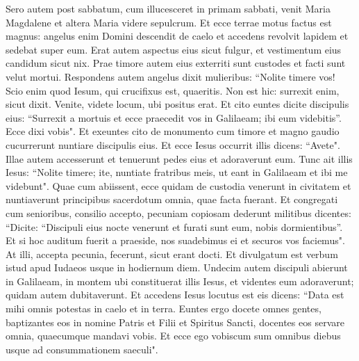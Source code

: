 \begin{biblechapter}  
\verse Sero autem post sabbatum, cum illucesceret in primam sabbati, venit Maria Magdalene et altera Maria videre sepulcrum. 
\verse Et ecce terrae motus factus est magnus: angelus enim Domini descendit de caelo et accedens revolvit lapidem et sedebat super eum. 
\verse Erat autem aspectus eius sicut fulgur, et vestimentum eius candidum sicut nix. 
\verse Prae timore autem eius exterriti sunt custodes et facti sunt velut mortui. 
\verse Respondens autem angelus dixit mulieribus: “Nolite timere vos! Scio enim quod Iesum, qui crucifixus est, quaeritis. 
\verse Non est hic: surrexit enim, sicut dixit. Venite, videte locum, ubi positus erat. 
\verse Et cito euntes dicite discipulis eius: “Surrexit a mortuis et ecce praecedit vos in Galilaeam; ibi eum videbitis”. Ecce dixi vobis". 
\verse Et exeuntes cito de monumento cum timore et magno gaudio cucurrerunt nuntiare discipulis eius. 
\verse Et ecce Iesus occurrit illis dicens: “Avete". Illae autem accesserunt et tenuerunt pedes eius et adoraverunt eum. 
\verse Tunc ait illis Iesus: “Nolite timere; ite, nuntiate fratribus meis, ut eant in Galilaeam et ibi me videbunt". 
\verse Quae cum abiissent, ecce quidam de custodia venerunt in civitatem et nuntiaverunt principibus sacerdotum omnia, quae facta fuerant. 
\verse Et congregati cum senioribus, consilio accepto, pecuniam copiosam dederunt militibus 
\verse dicentes: “Dicite: “Discipuli eius nocte venerunt et furati sunt eum, nobis dormientibus”. 
\verse Et si hoc auditum fuerit a praeside, nos suadebimus ei et securos vos faciemus". 
\verse At illi, accepta pecunia, fecerunt, sicut erant docti. Et divulgatum est verbum istud apud Iudaeos usque in hodiernum diem. 
\verse Undecim autem discipuli abierunt in Galilaeam, in montem ubi constituerat illis Iesus, 
\verse et videntes eum adoraverunt; quidam autem dubitaverunt.  
\verse Et accedens Iesus locutus est eis dicens: “Data est mihi omnis potestas in caelo et in terra. 
\verse Euntes ergo docete omnes gentes, baptizantes eos in nomine Patris et Filii et Spiritus Sancti, 
\verse docentes eos servare omnia, quaecumque mandavi vobis. Et ecce ego vobiscum sum omnibus diebus usque ad consummationem saeculi".
\end{biblechapter}
